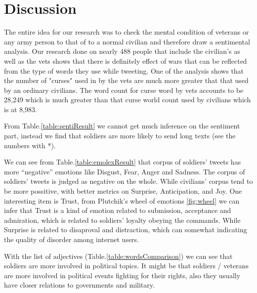 \section{Discussion}

The entire idea for our research was to check the mental condition of veterans or any army person to that of to a normal civilian and therefore draw a sentimental analysis. Our research done on nearly 488 people that include the civilian’s as well as the vets shows that there is definitely effect of wars that can be reflected from the type of words they use while tweeting. One of the analysis shows that the number of "curses" used in by the vets are much more greater that that used by an ordinary civilians. The word count for curse word by vets accounts to be 28,249 which is much greater than that curse world count used by civilians which is at 8,983.

From Table.\ref{table:sentiResult} we cannot get much inference on the sentiment part, instead we find that soldiers are more likely to send long texts (see the numbers with *).

We can see from Table.\ref{table:emolexResult} that corpus of soldiers' tweets has more \enquote{negative} emotions like Disgust, Fear, Anger and Sadness. The corpus of soldiers' tweets is judged as negative on the whole. While civilians' corpus tend to be more possitive, with better metrics on Surprise, Anticipation, and Joy. One interesting item is Trust, from Plutchik’s wheel of emotions \ref{fig:wheel} we can infer that Trust is a kind of emotion related to submission, acceptance and admiration, which is related to soldiers' loyalty obeying the commands. While Surprise is related to disaproval and distraction, which can somewhat indicating the quality of disorder among internet users.

With the list of adjectives (Table.\ref{table:wordsComparison}) we can see that soldiers are more involved in political topics. It might be that soldiers / veterans are more involved in political events fighting for their rights, also they usually have closer relations to governments and military.

